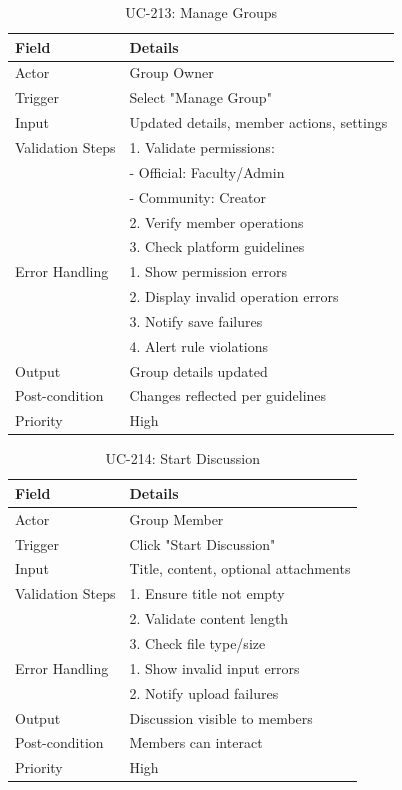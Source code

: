 \begin{table}[H]
\centering
\caption{UC-213: Manage Groups}
\begin{tabular}{|l|p{10cm}|}
\hline
\textbf{Field} & \textbf{Details} \\ \hline
Actor & Group Owner \\ \hline
Trigger & Select "Manage Group" \\ \hline
Input & Updated details, member actions, settings \\ \hline
Validation Steps & 1. Validate permissions: \\ 
                 & - Official: Faculty/Admin \\ 
                 & - Community: Creator \\ 
                 & 2. Verify member operations \\ 
                 & 3. Check platform guidelines \\ \hline
Error Handling & 1. Show permission errors \\ 
               & 2. Display invalid operation errors \\ 
               & 3. Notify save failures \\ 
               & 4. Alert rule violations \\ \hline
Output & Group details updated \\ \hline
Post-condition & Changes reflected per guidelines \\ \hline
Priority & High \\ \hline
\end{tabular}
\end{table}

\begin{table}[H]
\centering
\caption{UC-214: Start Discussion}
\begin{tabular}{|l|p{10cm}|}
\hline
\textbf{Field} & \textbf{Details} \\ \hline
Actor & Group Member \\ \hline
Trigger & Click "Start Discussion" \\ \hline
Input & Title, content, optional attachments \\ \hline
Validation Steps & 1. Ensure title not empty \\ 
                 & 2. Validate content length \\ 
                 & 3. Check file type/size \\ \hline
Error Handling & 1. Show invalid input errors \\ 
               & 2. Notify upload failures \\ \hline
Output & Discussion visible to members \\ \hline
Post-condition & Members can interact \\ \hline
Priority & High \\ \hline
\end{tabular}
\end{table}

